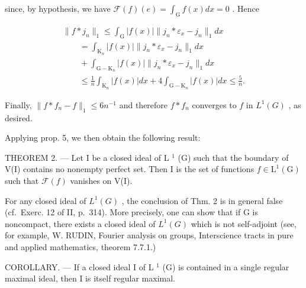 since, by hypothesis, we have \(\mathcal{F}(f)(e) = \int_{\mathrm{G}} f(x) dx = 0\) . Hence

\[
\begin{array}{l} \| f * j _ {n} \| _ {1} \leqslant \int_ {\mathrm{G}} | f (x) | \| j _ {n} * \varepsilon_ {x} - j _ {n} \| _ {1} d x \\ \qquad = \int_ {\mathrm{K} _ {n}} | f (x) | \| j _ {n} * \varepsilon_ {x} - j _ {n} \| _ {1} d x \\ \qquad + \int_ {\mathrm{G-K} _ {n}} | f (x) | \| j _ {n} * \varepsilon_ {x} - j _ {n} \| _ {1} d x \\ \qquad \leqslant \frac {1}{n} \int_ {\mathrm{K} _ {n}} | f (x) | d x + 4 \int_ {\mathrm{G-K} _ {n}} | f (x) | d x \leqslant \frac {5}{n}. \end{array}
\]

Finally, \(\|f * f_{n} - f\|_{1} \leqslant 6n^{-1}\) and therefore \(f * f_{n}\) converges to \(f\) in \(L^{1}(G)\) , as desired.

Applying prop. 5, we then obtain the following result:

THEOREM 2. --- Let I be a closed ideal of L \(^{1}\) (G) such that the boundary of V(I) contains no nonempty perfect set. Then I is the set of functions \(f \in \text{L}^{1}(\text{G})\) such that \(\mathcal{F}(f)\) vanishes on V(I).

For any closed ideal of \(L^{1}(G)\) , the conclusion of Thm. 2 is in general false (cf.~Exerc. 12 of II, p.~314). More precisely, one can show that if G is noncompact, there exists a closed ideal of \(L^{1}(G)\) which is not self-adjoint (see, for example, W. RUDIN, Fourier analysis on groups, Interscience tracts in pure and applied mathematics, theorem 7.7.1.)

COROLLARY. --- If a closed ideal I of L \(^{1}\) (G) is contained in a single regular maximal ideal, then I is itself regular maximal.

